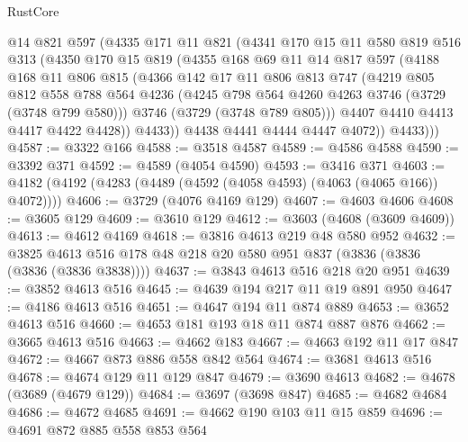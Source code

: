 \begin{lexlean}{RustCore}
\begin{coremodule}
          @14
          @821
          @597
          (@4335
            @171
            @11
            @821
            (@4341
              @170
              @15
              @11
              @580
              @819
              @516
              @313
              (@4350
                @170
                @15
                @819
                (@4355
                  @168
                  @69
                  @11
                  @14
                  @817
                  @597
                  (@4188
                    @168
                    @11
                    @806
                    @815
                    (@4366
                      @142
                      @17
                      @11
                      @806
                      @813
                      @747
                      (@4219
                        @805
                        @812
                        @558
                        @788
                        @564
                        @4236
                        (@4245 @798 @564 @4260 @4263 @3746 (@3729 (@3748 @799 @580)))
                        @3746
                        (@3729 (@3748 @789 @805)))
                      @4407
                      @4410
                      @4413
                      @4417
                      @4422
                      @4428))
                  @4433))
              @4438
              @4441
              @4444
              @4447
              @4072))
          @4433)))
@4587 := @3322 @166
@4588 := @3518 @4587
@4589 := @4586 @4588
@4590 := @3392 @371
@4592 := @4589 (@4054 @4590)
@4593 := @3416 @371
@4603 := @4182 (@4192 (@4283 (@4489 (@4592 (@4058 @4593) (@4063 (@4065 @166)) @4072))))
@4606 := @3729 (@4076 @4169 @129)
@4607 := @4603 @4606
@4608 := @3605 @129
@4609 := @3610 @129
@4612 := @3603 (@4608 (@3609 @4609))
@4613 := @4612 @4169
@4618 := @3816 @4613 @219 @48 @580 @952
@4632 := @3825 @4613 @516 @178 @48 @218 @20 @580 @951 @837 (@3836 (@3836 (@3836 (@3836 @3838))))
@4637 := @3843 @4613 @516 @218 @20 @951
@4639 := @3852 @4613 @516
@4645 := @4639 @194 @217 @11 @19 @891 @950
@4647 := @4186 @4613 @516
@4651 := @4647 @194 @11 @874 @889
@4653 := @3652 @4613 @516
@4660 := @4653 @181 @193 @18 @11 @874 @887 @876
@4662 := @3665 @4613 @516
@4663 := @4662 @183
@4667 := @4663 @192 @11 @17 @847
@4672 := @4667 @873 @886 @558 @842 @564
@4674 := @3681 @4613 @516
@4678 := @4674 @129 @11 @129 @847
@4679 := @3690 @4613
@4682 := @4678 (@3689 (@4679 @129))
@4684 := @3697 (@3698 @847)
@4685 := @4682 @4684
@4686 := @4672 @4685
@4691 := @4662 @190 @103 @11 @15 @859
@4696 := @4691 @872 @885 @558 @853 @564

\end{coremodule}
\end{lexlean}
